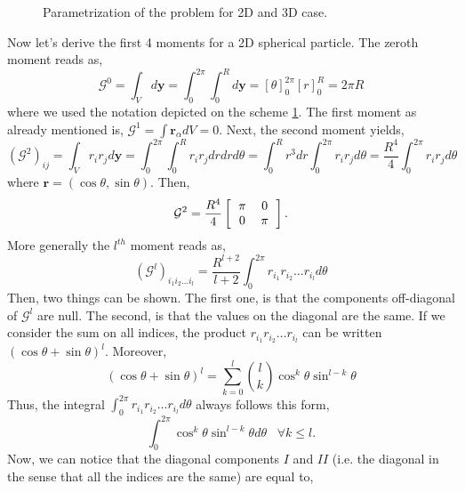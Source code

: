 {\begin{figure}[h!]
    \caption{Parametrization of the problem for 2D and 3D case.}
    \label{fig:schemeshpere}
\end{figure}
Now let's derive the first 4 moments for a 2D spherical particle. 
The zeroth moment reads as,
\begin{equation}
    \mathcal{G}^0 
    = \int_V  d\bm{y} 
    = \int_0^{2\pi}\int_0^{R}  d\bm{y} 
    = [\theta]_0^{2\pi}[r]_0^{R} 
    = 2\pi R
\end{equation}
where we used the notation depicted on the scheme \ref{fig:schemeshpere}.
The first moment as already mentioned is, $\mathcal{G}^1 = \int \bm{r}_\alpha dV = 0$.
Next, the second moment yields,
\begin{equation}
    (\mathcal{G}^2)_{ij}
    = \int_V r_ir_j d\bm{y} 
    = \int_0^{2\pi}\int_0^{R} r_ir_j d r dr d\theta 
    = \int_0^{R} r^3 dr \int_0^{2\pi} r_ir_j d\theta  
    = \frac{R^4}{4} \int_0^{2\pi} r_ir_j d\theta 
\end{equation}
where $\bm{r} = (\cos{\theta}, \sin{\theta})$. 
Then, 
\begin{equation}
    \mathcal{G}^2 = \frac{R^4}{4}\left[\begin{tabular}{cc}
        $\pi$&$0$\\
        $0$&$\pi$\\
    \end{tabular}
    \right].
\end{equation}
More generally the $l^{th}$ moment reads as, 
\begin{equation}
    (\mathcal{G}^l)_{i_1i_2\ldots i_l}
    = \frac{R^{l+2}}{l+2} \int_0^{2\pi} r_{i_1}r_{i_2}\ldots r_{i_l} d\theta 
\end{equation}
Then, two things can be shown. 
The first one, is that the components off-diagonal of $\mathcal{G}^l$ are null. 
The second, is that the values on the diagonal are the same. 
If we consider the sum on all indices, the product $r_{i_1}r_{i_2}\ldots r_{i_l}$ can be written $(\cos\theta+\sin\theta)^l$.
Moreover, 
\begin{equation}
    (\cos\theta+\sin\theta)^l  = \sum_{k=0}^l\binom{l}{k}\cos^k\theta\sin^{l-k}\theta
\end{equation}
Thus, the integral $\int_0^{2\pi} r_{i_1}r_{i_2}\ldots r_{i_l} d\theta$ always follows this form,
\begin{equation}
    \int_0^{2\pi} \cos^k\theta\sin^{l-k}\theta d\theta \;\;\;\forall k\leq l. 
    \label{eq:cossin}
\end{equation}
Now, we can notice that the diagonal components $I$ and $II$ (i.e. the diagonal in the sense that all the indices are the same) are equal to,
}
